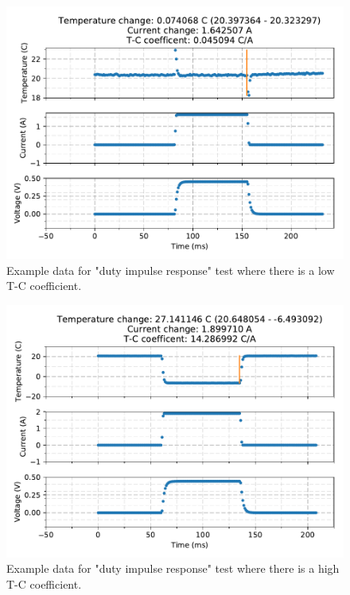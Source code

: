 \documentclass{article}
\begin{document}
\begin{figure}
    \center
    \includegraphics[scale=1]{figures/duty_impulse_response_data_0.pdf} 
    \caption{Example data for "duty impulse response" test where there is a low T-C coefficient.}
    \label{fig:duty_impulse_response_low}
\end{figure}

\begin{figure}
    \center
    \includegraphics[scale=1]{figures/duty_impulse_response_data_1.pdf} 
    \caption{Example data for "duty impulse response" test where there is a high T-C coefficient.}
    \label{fig:duty_impulse_response_high}
\end{figure}
\end{document}

